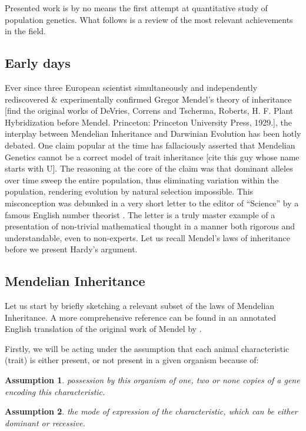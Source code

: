 \documentclass{l4proj}
\newtheorem{assum}{Assumption}
\begin{document}
Presented work is by no means the first attempt at quantitative study of population genetics. What follows is a review of the most relevant achievements in the field.

\subsection{Early days}
Ever since three European scientist simultaneously and independently rediscovered \& experimentally confirmed Gregor Mendel's theory of inheritance [find the original works of DeVries, Correns and Tscherma, Roberts, H. F. Plant Hybridization before Mendel. Princeton: Princeton University Press, 1929.], the interplay between Mendelian Inheritance and Darwinian Evolution has been hotly debated. One claim popular at the time has fallaciously asserted that Mendelian Genetics cannot be a correct model of trait inheritance [cite this guy whose name starts with U]. The reasoning at the core of the claim was that dominant alleles over time sweep the entire population, thus eliminating variation within the population, rendering evolution by natural selection impossible. This misconception was debunked in a very short letter to the editor of ``Science'' by a famous English number theorist \parencite{hardy08}. The letter is a truly master example of a presentation of non-trivial mathematical thought in a manner both rigorous and understandable, even to non-experts. Let us recall Mendel's laws of inheritance before we present Hardy's argument.

\subsection{Mendelian Inheritance}

Let us start by briefly sketching a relevant subset of the laws of Mendelian Inheritance. A more comprehensive reference can be found in an annotated English translation of the original work of Mendel by \cite{mendel}.

Firstly, we will be acting under the assumption that each animal characteristic (trait) is either present, or not present in a given organism because of:
\begin{assum}\label{genotypes}
  possession by this organism of one, two or none copies of a gene encoding this characteristic.
\end{assum}

\begin{assum}\label{dominance}
  the mode of expression of the characteristic, which can be either \gls{dominant} or \gls{recessive}.
\end{assum}
\end{document}
